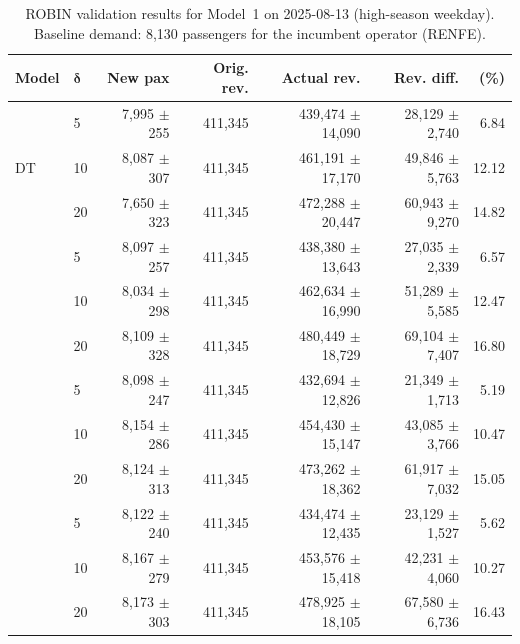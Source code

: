 \begin{table}[!h]
    \centering
    \caption{ROBIN validation results for Model~1 on 2025-08-13 (high-season weekday). Baseline demand: 8,130 passengers for the incumbent operator (RENFE).}
    \label{tab:model1_validation_2025_08_13}
    \scriptsize
    \setlength{\tabcolsep}{3pt}
    \begin{tabular}{llrrrrr}
        \toprule
        \textbf{Model}
        & \(\boldsymbol{\delta}\)
        & \textbf{New pax}
        & \textbf{Orig. rev.}
        & \textbf{Actual rev.}
        & \textbf{Rev. diff.}
        & \textbf{(\%)} \\
        \midrule
        \multirow{3}{*}{DT} & 5 & 7,995 $\pm$ 255 & 411,345 & 439,474 $\pm$ 14,090 & 28,129 $\pm$ 2,740 & 6.84 \\
         & 10 & 8,087 $\pm$ 307 & 411,345 & 461,191 $\pm$ 17,170 & 49,846 $\pm$ 5,763 & 12.12 \\
         & 20 & 7,650 $\pm$ 323 & 411,345 & 472,288 $\pm$ 20,447 & 60,943 $\pm$ 9,270 & 14.82 \\
        \addlinespace
        \multirow{3}{*}{RF} & 5 & 8,097 $\pm$ 257 & 411,345 & 438,380 $\pm$ 13,643 & 27,035 $\pm$ 2,339 & 6.57 \\
         & 10 & 8,034 $\pm$ 298 & 411,345 & 462,634 $\pm$ 16,990 & 51,289 $\pm$ 5,585 & 12.47 \\
         & 20 & 8,109 $\pm$ 328 & 411,345 & 480,449 $\pm$ 18,729 & 69,104 $\pm$ 7,407 & 16.80 \\
        \addlinespace
        \multirow{3}{*}{GBDT} & 5 & 8,098 $\pm$ 247 & 411,345 & 432,694 $\pm$ 12,826 & 21,349 $\pm$ 1,713 & 5.19 \\
         & 10 & 8,154 $\pm$ 286 & 411,345 & 454,430 $\pm$ 15,147 & 43,085 $\pm$ 3,766 & 10.47 \\
         & 20 & 8,124 $\pm$ 313 & 411,345 & 473,262 $\pm$ 18,362 & 61,917 $\pm$ 7,032 & 15.05 \\
        \addlinespace
        \multirow{3}{*}{FFNN} & 5 & 8,122 $\pm$ 240 & 411,345 & 434,474 $\pm$ 12,435 & 23,129 $\pm$ 1,527 & 5.62 \\
         & 10 & 8,167 $\pm$ 279 & 411,345 & 453,576 $\pm$ 15,418 & 42,231 $\pm$ 4,060 & 10.27 \\
         & 20 & 8,173 $\pm$ 303 & 411,345 & 478,925 $\pm$ 18,105 & 67,580 $\pm$ 6,736 & 16.43 \\
        \bottomrule
    \end{tabular}
\end{table}